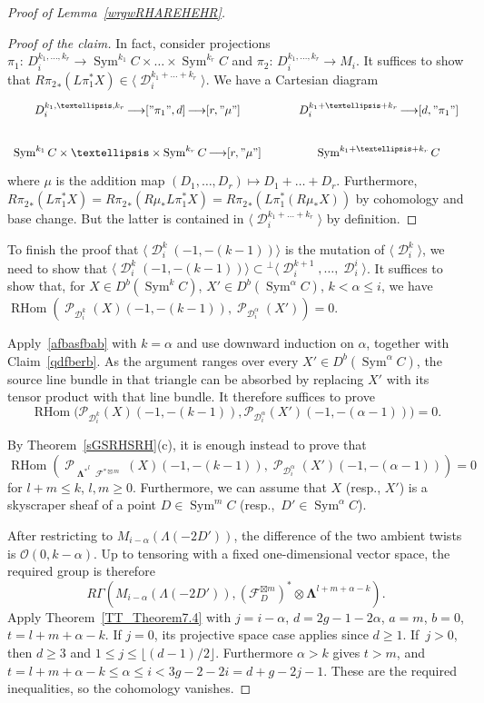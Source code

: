 \documentclass[11pt,letterpaper]{amsart}
\theoremstyle{plain}
\theoremstyle{definition}
\theoremstyle{remark}
\numberwithin{equation}{section}
\DeclareMathOperator{\RHom}{RHom}
\DeclareMathOperator{\Sym}{Sym}
\DeclareMathOperator{\cD}{\mathcal{D}}
\DeclareMathOperator{\cF}{\mathcal{F}}
\DeclareMathOperator{\cP}{\mathcal{P}}
\DeclareMathOperator{\bLambda}{{\boldsymbol\Lambda}}
\def\arrow{\mathop{\longrightarrow}\limits}
\begin{document}
\begin{proof}[Proof of Lemma~\ref{wrgwRHAREHEHR}]
\begin{proof}[Proof of the claim]
In fact, consider projections $\pi_1:\,D_i^{k_1,\ldots,k_r}\to \Sym^{k_1}C\times\ldots\times \Sym^{k_{r}}C$
and  $\pi_2:\,D_i^{k_1,\ldots,k_r}\to M_i$. It suffices to show  that $R{\pi_2}_*(L\pi_1^*X)\in \langle\cD_i^{k_1+\ldots+k_r}\rangle$.
We have a Cartesian diagram
$$    \begin{tikzcd}
    D_i^{k_1,\ldots,k_r} \arrow["\pi_1",d]\arrow[r,"\mu"] & D_i^{k_1+\ldots+k_r}\arrow[d,"\pi_1"]\\
    \Sym^{k_1}C\times\ldots\times\Sym^{k_r}C\arrow[r,"\mu"] &\Sym^{k_1+\ldots+k_r}C
     \end{tikzcd}
$$
where $\mu$ is the addition map $(D_1,\ldots,D_r)\mapsto D_1+\ldots+D_r$.
Furthermore, 
$R{\pi_2}_*(L\pi_1^*X)=R{\pi_2}_*(R\mu_*L\pi_1^*X)=R{\pi_2}_*(L\pi_1^*(R\mu_*X))$
by cohomology and base change. But the latter is contained in $\langle\cD_i^{k_1+\ldots+k_r}\rangle$
by definition.
\end{proof}




To finish the proof that $\langle\cD_i^k(-1,-(k-1))\rangle$
is the mutation of $\langle\cD_i^k\rangle$, we need to show that
$\langle\cD_i^k(-1,-(k-1))\rangle\subset{}^\perp\langle\cD_i^{k+1},\ldots,\cD_i^i\rangle$.
It suffices to show that, for $X\in D^b(\Sym^kC)$,  $X'\in D^b(\Sym^\alpha C)$, $k<\alpha\leq i$, 
we have
$\RHom(\cP_{\cD_i^k}(X)(-1,-(k-1)), \cP_{\cD_i^\alpha}(X'))=0$.

Apply~\eqref{afbasfbab} with $k=\alpha$ and use downward induction
on $\alpha$, together with Claim~\ref{qdfberb}.
As the argument ranges over every $X'\in D^b(\Sym^\alpha C)$, the source
line bundle in that triangle can be absorbed by replacing $X'$ with its
tensor product with that line bundle.  It therefore suffices to prove
\[
 \RHom\bigl(
 \mathcal P_{\mathcal D_i^k}(X)(-1,-(k-1)),
 \mathcal P_{\mathcal D_i^\alpha}(X')(-1,-(\alpha-1))
 \bigr)=0.
\]




By Theorem~\ref{sGSRHSRH}(c), it is enough instead to prove that
$$\RHom(\cP_{{\bLambda^*}^l{\cF^{*\boxtimes m}}}(X)(-1,-(k-1)),\cP_{\cD_i^\alpha}(X')(-1,-(\alpha-1)))=0$$
for $l+m\le k$, $l,m\ge0$. Furthermore, 
we can assume that $X$ (resp., $X'$)
is a skyscraper sheaf of a point $D\in \Sym^mC$ (resp.,~$D'\in\Sym^{\alpha}C$).

After restricting to $M_{i-\alpha}(\Lambda(-2D'))$, the difference
of the two ambient twists is $\mathcal O(0,k-\alpha)$.
Up to tensoring with a fixed one-dimensional vector space, the
required group is therefore
\[
 R\Gamma\!\left(M_{i-\alpha}(\Lambda(-2D')),
       (\mathcal F_D^{\boxtimes m})^*
       \otimes\boldsymbol\Lambda^{l+m+\alpha-k}\right).
\]
Apply Theorem~\ref{TT_Theorem7.4} with
$
 j=i-\alpha$, $d=2g-1-2\alpha$,
 $a=m$, $b=0$, $t=l+m+\alpha-k$.
If $j=0$, its projective space case applies since $d\ge1$.
If~$j>0$, then $d\ge3$ and
$1\le j\le\lfloor(d-1)/2\rfloor$.
Furthermore $\alpha>k$ gives $t>m$, and
$
 t=l+m+\alpha-k\le\alpha\le i
       <3g-2-2i=d+g-2j-1
$.
These are the required inequalities, so the cohomology vanishes.
\end{proof}
\end{document}

